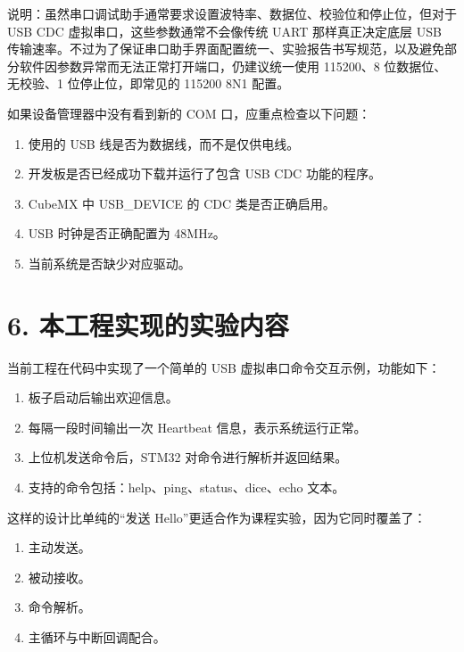 \documentclass[
  chinese,
  UTF8,
  oneside,
  openany]{ctexbook}
\providecommand{\tightlist}{%
  \setlength{\itemsep}{0pt}\setlength{\parskip}{0pt}}
\begin{document}
说明：虽然串口调试助手通常要求设置波特率、数据位、校验位和停止位，但对于
USB CDC 虚拟串口，这些参数通常不会像传统 UART 那样真正决定底层 USB
传输速率。不过为了保证串口助手界面配置统一、实验报告书写规范，以及避免部分软件因参数异常而无法正常打开端口，仍建议统一使用
115200、8 位数据位、无校验、1 位停止位，即常见的 115200 8N1 配置。

如果设备管理器中没有看到新的 COM 口，应重点检查以下问题：

\begin{enumerate}
\def\labelenumi{\arabic{enumi}.}
\tightlist
\item
  使用的 USB 线是否为数据线，而不是仅供电线。
\item
  开发板是否已经成功下载并运行了包含 USB CDC 功能的程序。
\item
  CubeMX 中 USB\_DEVICE 的 CDC 类是否正确启用。
\item
  USB 时钟是否正确配置为 48MHz。
\item
  当前系统是否缺少对应驱动。
\end{enumerate}

\section{6.
本工程实现的实验内容}\label{ux672cux5de5ux7a0bux5b9eux73b0ux7684ux5b9eux9a8cux5185ux5bb9}

当前工程在代码中实现了一个简单的 USB 虚拟串口命令交互示例，功能如下：

\begin{enumerate}
\def\labelenumi{\arabic{enumi}.}
\tightlist
\item
  板子启动后输出欢迎信息。
\item
  每隔一段时间输出一次 Heartbeat 信息，表示系统运行正常。
\item
  上位机发送命令后，STM32 对命令进行解析并返回结果。
\item
  支持的命令包括：help、ping、status、dice、echo 文本。
\end{enumerate}

这样的设计比单纯的``发送 Hello''更适合作为课程实验，因为它同时覆盖了：

\begin{enumerate}
\def\labelenumi{\arabic{enumi}.}
\tightlist
\item
  主动发送。
\item
  被动接收。
\item
  命令解析。
\item
  主循环与中断回调配合。
\end{enumerate}
\end{document}

